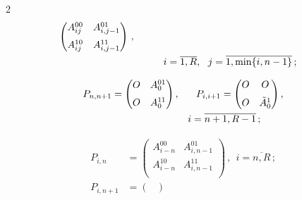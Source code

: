 \begin{multicols}{2}
\begin{align}
\begin{pmatrix}
A^{00}_{ij} & A^{01}_{i,j-1} \\[6pt]


A^{10}_{ij} & A^{11}_{i,j-1} \\


\end{pmatrix}\,,\notag \\


&\ \ \ \ \ \ \ \ \ i=\overline{1,R}, \ \ j=\overline{1,\min\{i,n-1\}}\,;


\end{align}


\begin{gather}


P_{n,n+1}=


\begin{pmatrix}


O & A^{01}_{0}\\[6pt]


O & A^{11}_{0}\\


\end{pmatrix}, \ \ \ \ \


P_{i,i+1}=


\begin{pmatrix}


O & O\\[6pt]


O & \Tilde A_0^1 \\


\end{pmatrix}, \notag\\


\ \ \ \  \  \ \ \ \hspace*{20mm} i=\overline{n+1,R-1}\,;


\end{gather}


\begin{align}


P_{i,n}& =


\begin{pmatrix}


A^{00}_{i-n} & A^{01}_{i,n-1} \\[6pt]


A^{10}_{i-n} & A^{11}_{i,n-1} \\


\end{pmatrix}\,, \ \ i=\overline{n,R}\,;\\


P_{i,n+1}&=


\begin{pmatrix}



\end{pmatrix}
\end{align}
\end{multicols}

